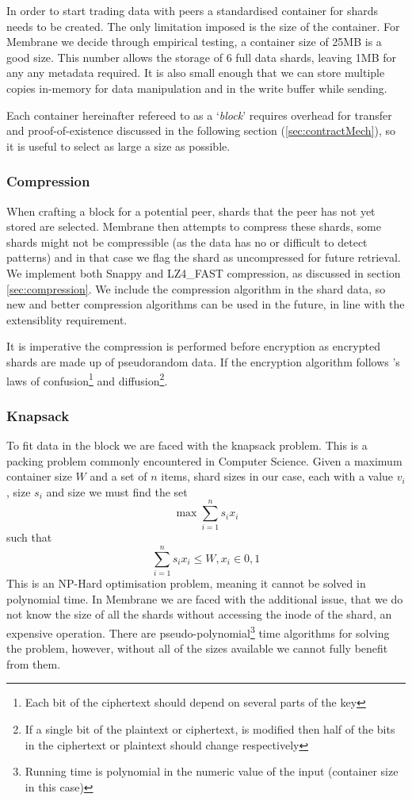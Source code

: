 \documentclass[11pt, a4paper, twocolumn, twoside]{report}
\begin{document}
In order to start trading data with peers a standardised container for shards needs to be created. The only limitation imposed is the size of the container. For Membrane we decide through empirical testing, a container size of 25MB is a good size. This number allows the storage of 6 full data shards, leaving 1MB for any any metadata required. It is also small enough that we can store multiple copies in-memory for data manipulation and in the write buffer while sending.

Each container hereinafter refereed to as a `\emph{block}' requires overhead for transfer and proof-of-existence discussed in the following section (\ref{sec:contractMech}), so it is useful to select as large a size as possible.

\subsubsection{Compression}

When crafting a block for a potential peer, shards that the peer has not yet stored are selected. Membrane then attempts to compress these shards, some shards might not be compressible (as the data has no or difficult to detect patterns) and in that case we flag the shard as uncompressed for future retrieval. We implement both Snappy and LZ4\_FAST compression, as discussed in section \ref{sec:compression}. We include the compression algorithm in the shard data, so new and better compression algorithms can be used in the future, in line with the extensiblity requirement.

It is imperative the compression is performed before encryption as encrypted shards are made up of pseudorandom data. If the encryption algorithm follows \cite{shannon1945mathematical}'s laws of confusion\footnote{Each bit of the ciphertext should depend on several parts of the key} and diffusion\footnote{If a single bit of the plaintext or ciphertext, is modified then half of the bits in the ciphertext or plaintext should change respectively}.

\subsubsection{Knapsack}

To fit data in the block we are faced with the knapsack problem. This is a packing problem commonly encountered in Computer Science. \citep{skiena1999interested} Given a maximum container size $W$ and a set of $n$ items, shard sizes in our case, each with a value $v_i$, size $s_i$ and size we must find the set 
$$\max \sum_{i=1}^{n} s_{i}x_{i}$$ 
such that 
$$\sum_{i=1}^{n} s_{i}x_{i} \leq W, x_i \in {0, 1}$$
This is an NP-Hard optimisation problem, \citep{skiena1999interested} meaning it cannot be solved in polynomial time. In Membrane we are faced with the additional issue, that we do not know the size of all the shards without accessing the inode of the shard, an expensive operation. There are pseudo-polynomial\footnote{Running time is polynomial in the numeric value of the input (container size in this case)} time algorithms for solving the problem, however, without all of the sizes available we cannot fully benefit from them.
\end{document}
